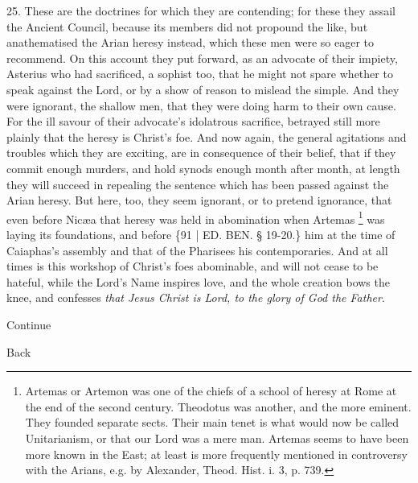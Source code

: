 25. These are the doctrines
for which they are contending; for these they assail the Ancient
Council, because its members did not propound the like, but
anathematised the Arian heresy instead, which these men were so eager
to recommend. On this account they put forward, as an advocate of
their impiety, Asterius who had sacrificed, a sophist too, that he
might not spare whether to speak against the Lord, or by a show of
reason to mislead the simple. And they were ignorant, the shallow men,
that they were doing harm to their own cause. For the ill savour of
their advocate's idolatrous sacrifice, betrayed still more plainly
that the heresy is Christ's foe. And now again, the general agitations
and troubles which they are exciting, are in consequence of their
belief, that if they commit enough murders, and hold synods enough
month after month, at length they will succeed in repealing the
sentence which has been passed against the Arian heresy. But here,
too, they seem ignorant, or to pretend ignorance, that even before Nicæa
that heresy was held in abomination when Artemas \footnote{Artemas or Artemon was one of the chiefs of a school of heresy at Rome
at the end of the second century. Theodotus was another, and the more
eminent. They founded separate sects. Their main tenet is what would
now be called Unitarianism, or that our Lord was a mere man. Artemas
seems to have been more known in the East; at least is more frequently
mentioned in controversy with the Arians, e.g. by Alexander, Theod.
Hist. i. 3, p. 739.} was laying its foundations, and before \{91 | ED. BEN.
§ 19-20.\} him at the time of Caiaphas's assembly and that of the
Pharisees his contemporaries. And at all times is this workshop of
Christ's foes abominable, and will not cease to be hateful, while the
Lord's Name inspires love, and the whole creation bows the knee, and
confesses \emph{that Jesus Christ is Lord, to the glory of God the Father}.

Continue



Back

